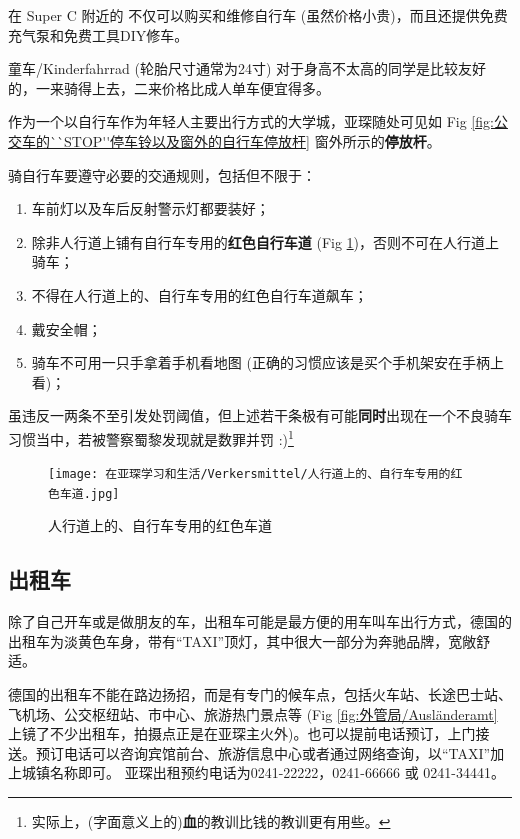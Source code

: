     在 Super C 附近的  不仅可以购买和维修自行车 (虽然价格小贵)，而且还提供免费充气泵和免费工具DIY修车。

    童车/Kinderfahrrad (轮胎尺寸通常为24寸) 对于身高不太高的同学是比较友好的，一来骑得上去，二来价格比成人单车便宜得多。

    作为一个以自行车作为年轻人主要出行方式的大学城，亚琛随处可见如 Fig \ref{fig:公交车的``STOP''停车铃以及窗外的自行车停放杆} 窗外所示的\textbf{停放杆}。

    骑自行车要遵守必要的交通规则，包括但不限于：

    \begin{enumerate}
      \item 车前灯以及车后反射警示灯都要装好；
      \item 除非人行道上铺有自行车专用的\textbf{红色自行车道} (Fig \ref{fig:人行道上的、自行车专用的红色车道})，否则不可在人行道上骑车；
      \item 不得在人行道上的、自行车专用的红色自行车道飙车；
      \item 戴安全帽；
      \item 骑车不可用一只手拿着手机看地图 (正确的习惯应该是买个手机架安在手柄上看)；
    \end{enumerate}

    虽违反一两条不至引发处罚阈值，但上述若干条极有可能\textbf{同时}出现在一个不良骑车习惯当中，若被警察蜀黎发现就是数罪并罚 :)\footnote{实际上，(字面意义上的)\textbf{血}的教训比钱的教训更有用些。}

    \begin{figure}
      \centering
      \texttt{[image: 在亚琛学习和生活/Verkersmittel/人行道上的、自行车专用的红色车道.jpg]}
      \caption{人行道上的、自行车专用的红色车道}
      \label{fig:人行道上的、自行车专用的红色车道}
    \end{figure}

  \subsection{出租车}\label{subsec:出租车}

    除了自己开车或是做朋友的车，出租车可能是最方便的用车叫车出行方式，德国的出租车为淡黄色车身，带有``TAXI''顶灯，其中很大一部分为奔驰品牌，宽敞舒适。

    德国的出租车不能在路边扬招，而是有专门的候车点，包括火车站、长途巴士站、飞机场、公交枢纽站、市中心、旅游热门景点等 (Fig \ref{fig:外管局/Ausländeramt} 上镜了不少出租车，拍摄点正是在亚琛主火外)。也可以提前电话预订，上门接送。预订电话可以咨询宾馆前台、旅游信息中心或者通过网络查询，以``TAXI''加上城镇名称即可。 亚琛出租预约电话为0241-22222，0241-66666 或 0241-34441。

